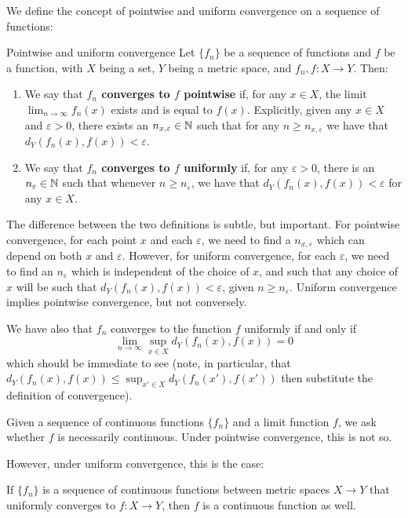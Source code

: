 We define the concept of pointwise and uniform convergence on a sequence of functions:
\begin{bdefin}{Pointwise and uniform convergence}{}
Let $\{f_{n}\}$ be a sequence of functions and $f$ be a function, with $X$ being a set, $Y$ being a metric space, and \mbox{$f_{n}, f: X\to Y$}. Then:
\begin{enumerate}
    \item We say that \textbf{$f_{n}$ converges to $f$ pointwise} if, for any $x\in X$, the limit $\lim_{n\to\infty}f_{n}(x)$ exists and is equal to $f(x)$. Explicitly, given any $x\in X$ and $\varepsilon>0$, there exists an $n_{x,\varepsilon}\in \mathbb{N}$ such that for any $n\geq n_{x,\varepsilon}$ we have that $d_{Y}(f_{n}(x), f(x)) < \varepsilon$.
    \item We say that \textbf{$f_{n}$ converges to $f$ uniformly} if, for any $\varepsilon>0$, there is an $n_{\varepsilon}\in \mathbb{N}$ such that whenever $n\geq n_{\varepsilon}$, we have that $d_{Y}(f_{n}(x),f(x)) < \varepsilon$ for any $x\in X$.
\end{enumerate}
\end{bdefin}
The difference between the two definitions is subtle, but important. For pointwise convergence, for each point $x$ and each $\varepsilon$, we need to find a $n_{x,\varepsilon}$ which can depend on both $x$ and $\varepsilon$. However, for uniform convergence, for each $\varepsilon$, we need to find an $n_{\varepsilon}$ which is independent of the choice of $x$, and such that any choice of $x$ will be such that $d_{Y}(f_{n}(x),f(x)) < \varepsilon$, given $n\geq n_{\varepsilon}$. Uniform convergence implies pointwise convergence, but not conversely.

We have also that $f_{n}$ converges to the function $f$ uniformly if and only if \[ \lim_{n\to\infty} \sup_{x\in X} d_{Y}(f_{n}(x),f(x)) = 0 \] which should be immediate to see (note, in particular, that \mbox{$d_{Y}(f_{n}(x),f(x)) \leq \sup_{x'\in X} d_{Y}(f_{n}(x'),f(x'))$} then substitute the definition of convergence).

Given a sequence of continuous functions $\{f_{n}\}$ and a limit function $f$, we ask whether $f$ is necessarily continuous. Under pointwise convergence, this is not so. 

%

However, under uniform convergence, this is the case:

\begin{btheorem}{}{}
If $\{f_{n}\}$ is a sequence of continuous functions between metric spaces $X\to Y$ that uniformly converges to $f: X\to Y$, then $f$ is a continuous function as well.
\end{btheorem}

